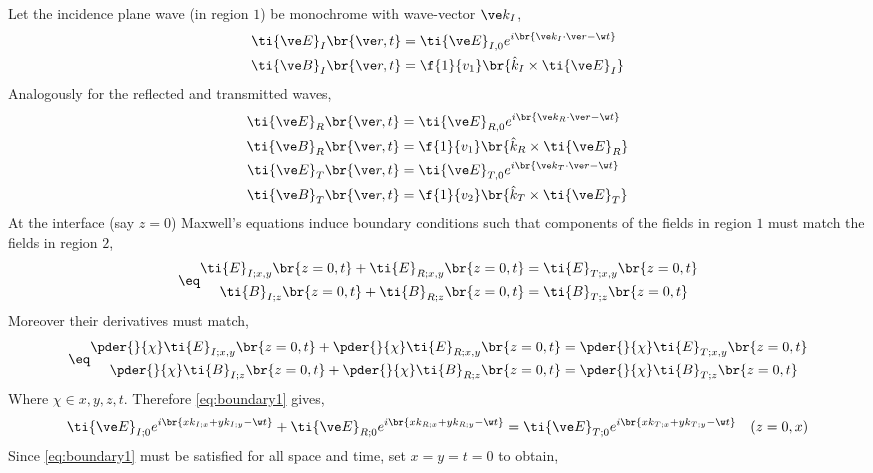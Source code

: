 \documentclass{article}
\begin{document}
Let the incidence plane wave (in region $1$) be monochrome with wave-vector $\ve k_I$,
\begin{align*}
    \ti {\ve E}_I\br{\ve r, t} &= \ti {\ve E}_{I,0} e^{i\br{\ve k_I \cdot \ve r - \w t}} \\
    \ti {\ve B}_I\br{\ve r, t} &= \f{1}{v_{1}} \br{\hat k_I \times \ti {\ve E}_I}
\end{align*}
Analogously for the reflected and transmitted waves,
\begin{align*}
    \ti {\ve E}_R\br{\ve r, t} &= \ti {\ve E}_{R,0} e^{i\br{\ve k_R \cdot \ve r - \w t}} \\
    \ti {\ve B}_R\br{\ve r, t} &= \f{1}{v_{1}} \br{\hat k_R \times \ti {\ve E}_R} \\
    \ti {\ve E}_T\br{\ve r, t} &= \ti {\ve E}_{T,0} e^{i\br{\ve k_T \cdot \ve r - \w t}} \\
    \ti {\ve B}_T\br{\ve r, t} &= \f{1}{v_{2}} \br{\hat k_T \times \ti {\ve E}_T}
\end{align*}
At the interface (say $z = 0$) Maxwell's equations induce boundary conditions such that components of the fields in region $1$ must match the fields in region $2$,
\begin{align*}
    \eq \label{eq:boundary1}
    \begin{split}
    \ti {E}_{I; x,y}\br{z=0, t} + \ti {E}_{R; x,y}\br{z=0, t} &= \ti {E}_{T; x,y}\br{z=0, t}  \\
    \ti {B}_{I; z}\br{z=0, t} + \ti {B}_{R; z}\br{z=0, t} &= \ti {B}_{T; z}\br{z=0, t}
    \end{split}
\end{align*}
Moreover their derivatives must match,
\begin{align*}
    \eq \label{eq:boundary2}
    \begin{split}
   \pder{}{\chi} \ti {E}_{I;x,y}\br{z=0, t} + \pder{}{\chi}\ti {E}_{R;x,y}\br{z=0, t} &= \pder{}{\chi}\ti {E}_{T;x,y}\br{z=0, t}  \\
    \pder{}{\chi}\ti {B}_{I;z}\br{z=0, t} + \pder{}{\chi}\ti {B}_{R;z}\br{z=0, t} &= \pder{}{\chi}\ti {B}_{T;z}\br{z=0, t}
    \end{split}
\end{align*}
Where $\chi \in x,y,z,t$. Therefore \cref{eq:boundary1} gives,
\[ \ti {\ve E}_{I;0} e^{i\br{x k_{I;x} + y k_{I;y} - \w t}} + \ti {\ve E}_{R;0} e^{i\br{x k_{R;x} + y k_{R;y} - \w t}} = \ti {\ve E}_{T;0} e^{i\br{x k_{T;x} + y k_{T;y} - \w t}} \quad (z=0, x) \]
Since \cref{eq:boundary1} must be satisfied for all space and time, set $x=y=t=0$ to obtain,
\end{document}
